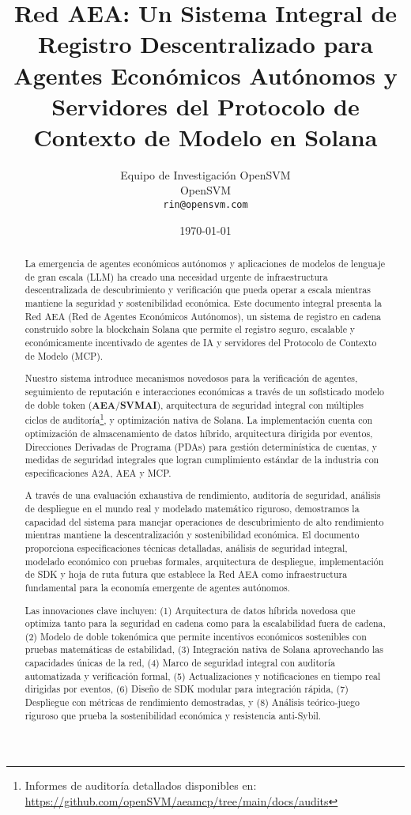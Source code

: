 \documentclass[12pt,a4paper]{article}
\title{Red AEA: Un Sistema Integral de Registro Descentralizado para Agentes Económicos Autónomos y Servidores del Protocolo de Contexto de Modelo en Solana}
\author{Equipo de Investigación OpenSVM\\
OpenSVM\\
\texttt{rin@opensvm.com}}
\date{\today}
\begin{document}
\maketitle

\begin{abstract}
La emergencia de agentes económicos autónomos y aplicaciones de modelos de lenguaje de gran escala (LLM) ha creado una necesidad urgente de infraestructura descentralizada de descubrimiento y verificación que pueda operar a escala mientras mantiene la seguridad y sostenibilidad económica. Este documento integral presenta la Red AEA (Red de Agentes Económicos Autónomos), un sistema de registro en cadena construido sobre la blockchain Solana que permite el registro seguro, escalable y económicamente incentivado de agentes de IA y servidores del Protocolo de Contexto de Modelo (MCP).

Nuestro sistema introduce mecanismos novedosos para la verificación de agentes, seguimiento de reputación e interacciones económicas a través de un sofisticado modelo de doble token (\textbf{AEA}/\textbf{SVMAI}), arquitectura de seguridad integral con múltiples ciclos de auditoría\footnote{Informes de auditoría detallados disponibles en: \url{https://github.com/openSVM/aeamcp/tree/main/docs/audits}}, y optimización nativa de Solana. La implementación cuenta con optimización de almacenamiento de datos híbrido, arquitectura dirigida por eventos, Direcciones Derivadas de Programa (PDAs) para gestión determinística de cuentas, y medidas de seguridad integrales que logran cumplimiento estándar de la industria con especificaciones A2A, AEA y MCP.

A través de una evaluación exhaustiva de rendimiento, auditoría de seguridad, análisis de despliegue en el mundo real y modelado matemático riguroso, demostramos la capacidad del sistema para manejar operaciones de descubrimiento de alto rendimiento mientras mantiene la descentralización y sostenibilidad económica. El documento proporciona especificaciones técnicas detalladas, análisis de seguridad integral, modelado económico con pruebas formales, arquitectura de despliegue, implementación de SDK y hoja de ruta futura que establece la Red AEA como infraestructura fundamental para la economía emergente de agentes autónomos.

Las innovaciones clave incluyen: (1) Arquitectura de datos híbrida novedosa que optimiza tanto para la seguridad en cadena como para la escalabilidad fuera de cadena, (2) Modelo de doble tokenómica que permite incentivos económicos sostenibles con pruebas matemáticas de estabilidad, (3) Integración nativa de Solana aprovechando las capacidades únicas de la red, (4) Marco de seguridad integral con auditoría automatizada y verificación formal, (5) Actualizaciones y notificaciones en tiempo real dirigidas por eventos, (6) Diseño de SDK modular para integración rápida, (7) Despliegue con métricas de rendimiento demostradas, y (8) Análisis teórico-juego riguroso que prueba la sostenibilidad económica y resistencia anti-Sybil.


\end{abstract}
\end{document}
